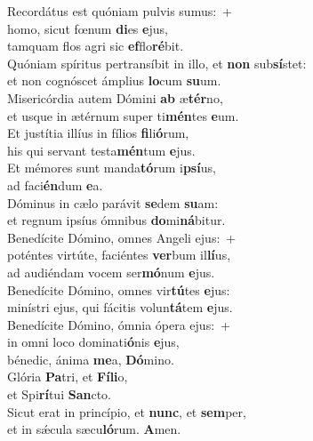 \evenverse Recordátus est quóniam pulvis sumus:~+\\\evenverse  homo, sicut fœnum \textbf{di}es \textbf{e}jus,~\*\\
\evenverse tamquam flos agri sic \textbf{ef}flo\textbf{ré}bit.\\
\oddverse Quóniam spíritus pertransíbit in illo, et \textbf{non} sub\textbf{sí}stet:~\*\\
\oddverse et non cognóscet ámplius \textbf{lo}cum \textbf{su}um.\\
\evenverse Misericórdia autem Dómini \textbf{ab} æ\textbf{tér}no,~\*\\
\evenverse et usque in ætérnum super ti\textbf{mén}tes \textbf{e}um.\\
\oddverse Et justítia illíus in fílios \textbf{fi}li\textbf{ó}rum,~\*\\
\oddverse his qui servant testa\textbf{mén}tum \textbf{e}jus.\\
\evenverse Et mémores sunt manda\textbf{tó}rum i\textbf{psí}us,~\*\\
\evenverse ad faci\textbf{én}dum \textbf{e}a.\\
\oddverse Dóminus in cælo parávit \textbf{se}dem \textbf{su}am:~\*\\
\oddverse et regnum ipsíus ómnibus \textbf{do}mi\textbf{ná}bitur.\\
\evenverse Benedícite Dómino, omnes Angeli ejus:~+\\
\evenverse  poténtes virtúte, faciéntes \textbf{ver}bum il\textbf{lí}us,~\*\\
\evenverse ad audiéndam vocem ser\textbf{mó}num \textbf{e}jus.\\
\oddverse Benedícite Dómino, omnes vir\textbf{tú}tes \textbf{e}jus:~\*\\
\oddverse minístri ejus, qui fácitis volun\textbf{tá}tem \textbf{e}jus.\\
\evenverse Benedícite Dómino, ómnia ópera ejus:~+\\
\evenverse  in omni loco dominati\textbf{ó}nis \textbf{e}jus,~\*\\
\evenverse bénedic, ánima \textbf{me}a, \textbf{Dó}mino.\\
\oddverse Glória \textbf{Pa}tri, et \textbf{Fí}\textbf{li}o,~\*\\
\oddverse et Spi\textbf{rí}tui \textbf{San}cto.\\
\evenverse Sicut erat in princípio, et \textbf{nunc}, et \textbf{sem}per,~\*\\
\evenverse et in sǽcula sæcu\textbf{ló}rum. \textbf{A}men.\\
